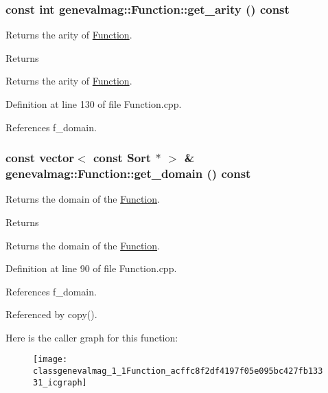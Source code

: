 \hypertarget{classgenevalmag_1_1Function_a30fc3347320a9cbeb37b8d45aac3737e}{
\subsubsection[{get\_\-arity}]{\setlength{\rightskip}{0pt plus 5cm}const int genevalmag::Function::get\_\-arity () const}}
\label{classgenevalmag_1_1Function_a30fc3347320a9cbeb37b8d45aac3737e}
Returns the arity of \hyperlink{classgenevalmag_1_1Function}{Function}. \begin{DoxyReturn}{Returns}

\end{DoxyReturn}
Returns the arity of \hyperlink{classgenevalmag_1_1Function}{Function}. 

Definition at line 130 of file Function.cpp.



References f\_\-domain.

\hypertarget{classgenevalmag_1_1Function_acffc8f2df4197f05e095bc427fb13331}{
\subsubsection[{get\_\-domain}]{\setlength{\rightskip}{0pt plus 5cm}const vector$<$ const {\bf Sort} $\ast$ $>$ \& genevalmag::Function::get\_\-domain () const}}
\label{classgenevalmag_1_1Function_acffc8f2df4197f05e095bc427fb13331}
Returns the domain of the \hyperlink{classgenevalmag_1_1Function}{Function}. \begin{DoxyReturn}{Returns}

\end{DoxyReturn}
Returns the domain of the \hyperlink{classgenevalmag_1_1Function}{Function}. 

Definition at line 90 of file Function.cpp.



References f\_\-domain.



Referenced by copy().



Here is the caller graph for this function:\nopagebreak
\begin{figure}[H]
\begin{center}
\leavevmode
\texttt{[image: classgenevalmag\_1\_1Function\_acffc8f2df4197f05e095bc427fb13331\_icgraph]}
\end{center}
\end{figure}


